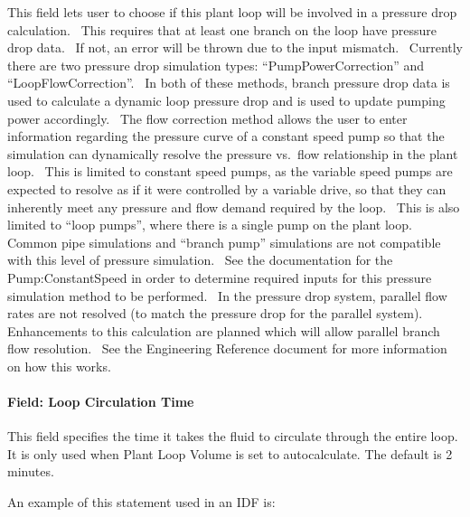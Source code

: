 This field lets user to choose if this plant loop will be involved in a pressure drop calculation.~ This requires that at least one branch on the loop have pressure drop data.~ If not, an error will be thrown due to the input mismatch.~ Currently there are two pressure drop simulation types: ``PumpPowerCorrection'' and ``LoopFlowCorrection''.~ In both of these methods, branch pressure drop data is used to calculate a dynamic loop pressure drop and is used to update pumping power accordingly.~ The flow correction method allows the user to enter information regarding the pressure curve of a constant speed pump so that the simulation can dynamically resolve the pressure vs.~flow relationship in the plant loop.~ This is limited to constant speed pumps, as the variable speed pumps are expected to resolve as if it were controlled by a variable drive, so that they can inherently meet any pressure and flow demand required by the loop.~ This is also limited to ``loop pumps'', where there is a single pump on the plant loop. Common pipe simulations and ``branch pump'' simulations are not compatible with this level of pressure simulation.~ See the documentation for the Pump:ConstantSpeed in order to determine required inputs for this pressure simulation method to be performed.~ In the pressure drop system, parallel flow rates are not resolved (to match the pressure drop for the parallel system).~ Enhancements to this calculation are planned which will allow parallel branch flow resolution.~ See the Engineering Reference document for more information on how this works.

\paragraph{Field: Loop Circulation Time}\label{field-pressure-simulation-type}

This field specifies the time it takes the fluid to circulate through the entire loop. It is only used when Plant Loop Volume is set to autocalculate. The default is 2 minutes.

An example of this statement used in an IDF is:


